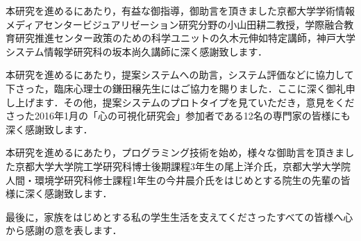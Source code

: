 本研究を進めるにあたり，有益な御指導，御助言を頂きました京都大学学術情報メディアセンタービジュアリゼーション研究分野の小山田耕二教授，学際融合教育研究推進センター政策のための科学ユニットの久木元伸如特定講師，神戸大学 システム情報学研究科の坂本尚久講師に深く感謝致します．

本研究を進めるにあたり，提案システムへの助言，システム評価などに協力して下さった，臨床心理士の鎌田穣先生にはご協力を賜りました．ここに深く御礼申し上げます．その他，提案システムのプロトタイプを見ていただき，意見をくださった2016年1月の「心の可視化研究会」参加者である12名の専門家の皆様にも深く感謝致します．

本研究を進めるにあたり，プログラミング技術を始め，様々な御助言を頂きました京都大学大学院工学研究科博士後期課程3年生の尾上洋介氏，京都大学大学院人間・環境学研究科修士課程1年生の今井晨介氏をはじめとする院生の先輩の皆様に深く感謝致します．

最後に，家族をはじめとする私の学生生活を支えてくださったすべての皆様へ心から感謝の意を表します．